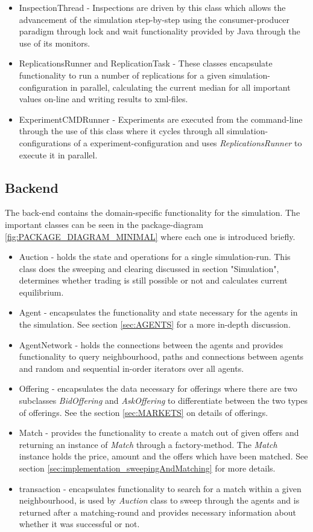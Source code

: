 \documentclass[Bachelorarbeit.tex]{subfiles}
\begin{document}
\begin{itemize}
\item InspectionThread - Inspections are driven by this class which allows the advancement of the simulation step-by-step using the consumer-producer paradigm through lock and wait functionality provided by Java through the use of its monitors.
\item ReplicationsRunner and ReplicationTask - These classes encapsulate functionality to run a number of replications for a given simulation-configuration in parallel, calculating the current median for all important values on-line and writing results to xml-files.
\item ExperimentCMDRunner - Experiments are executed from the command-line through the use of this class where it cycles through all simulation-configurations of a experiment-configuration and uses \textit{ReplicationsRunner} to execute it in parallel. 
\end{itemize}

\subsection{Backend}
The back-end contains the domain-specific functionality for the simulation. The important classes can be seen in the package-diagram \ref{fig:PACKAGE_DIAGRAM_MINIMAL} where each one is introduced briefly.

\begin{itemize}
\item Auction - holds the state and operations for a single simulation-run. This class does the sweeping and clearing discussed in section "Simulation", determines whether trading is still possible or not and calculates current equilibrium.
\item Agent - encapsulates the functionality and state necessary for the agents in the simulation. See section \ref{sec:AGENTS} for a more in-depth discussion.
\item AgentNetwork - holds the connections between the agents and provides functionality to query neighbourhood, paths and connections between agents and random and sequential in-order iterators over all agents.
\item Offering - encapsulates the data necessary for offerings where there are two subclasses \textit{BidOffering} and \textit{AskOffering} to differentiate between the two types of offerings. See the section \ref{sec:MARKETS} on details of offerings.
\item Match - provides the functionality to create a match out of given offers and returning an instance of \textit{Match} through a factory-method. The \textit{Match} instance holds the price, amount and the offers which have been matched. See section \ref{sec:implementation_sweepingAndMatching} for more details.
\item \Gls{transaction} - encapsulates functionality to search for a match within a given neighbourhood, is used by \textit{Auction} class to sweep through the agents and is returned after a matching-round and provides necessary information about whether it was successful or not.
\end{itemize}
\end{document}
